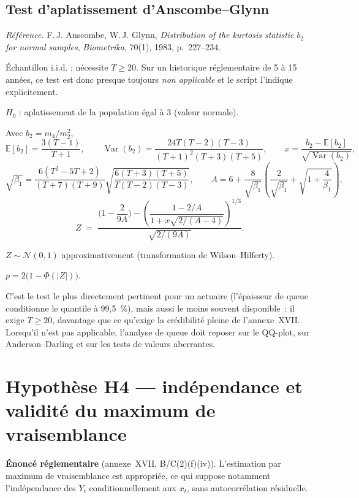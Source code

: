 \documentclass[a4paper,11pt]{article}
\newcommand{\refl}[1]{{\small\textcolor{maincolor!70!black}{\textit{Référence.} #1}}\par\smallskip}
\newcounter{ficheid}
\newenvironment{fiche}[1]{%
  \stepcounter{ficheid}%
  \phantomsection
  \subsection{#1}%
  \label{fiche:\theficheid}%
}{%
  \end{description}\vspace{0.5em}%
}
\newcommand{\Cadre}{%
  \begin{description}[leftmargin=0pt, style=unboxed, itemsep=3pt, topsep=3pt, parsep=2pt]%
  \item[\textcolor{financeblue}{\textbf{1. Cadre, notations et hypothèses de validité (non testées).}}]}
\newcommand{\Hzero}{\item[\textcolor{financeblue}{\textbf{2. Hypothèse nulle.}}]}
\newcommand{\Stat}{\item[\textcolor{financeblue}{\textbf{3. Statistique de test.}}]}
\newcommand{\Loi}{\item[\textcolor{financeblue}{\textbf{4. Loi sous $H_0$.}}]}
\newcommand{\Pval}{\item[\textcolor{financeblue}{\textbf{5. p-value.}}]}
\newcommand{\Usage}{\item[\textcolor{financeblue}{\textbf{6. Usage et limites.}}]}
\begin{document}
\begin{fiche}{Test d'aplatissement d'Anscombe--Glynn}
\refl{F.\,J. Anscombe, W.\,J. Glynn, \emph{Distribution of the kurtosis statistic $b_2$ for
normal samples}, \emph{Biometrika}, 70(1), 1983, p.~227--234.}
\Cadre
Échantillon i.i.d. ; nécessite $T \ge 20$. Sur un historique réglementaire de 5 à 15 années, ce
test est donc presque toujours \emph{non applicable} et le script l'indique explicitement.
\Hzero
$H_0$ : aplatissement de la population égal à 3 (valeur normale).
\Stat
Avec $b_2 = m_4/m_2^2$,
\[
  \mathbb{E}[b_2] = \frac{3(T-1)}{T+1},
  \qquad
  \operatorname{Var}(b_2) = \frac{24T(T-2)(T-3)}{(T+1)^2(T+3)(T+5)},
  \qquad
  x = \frac{b_2 - \mathbb{E}[b_2]}{\sqrt{\operatorname{Var}(b_2)}},
\]
\[
  \sqrt{\beta_1} = \frac{6(T^2-5T+2)}{(T+7)(T+9)}\sqrt{\frac{6(T+3)(T+5)}{T(T-2)(T-3)}},
  \qquad
  A = 6 + \frac{8}{\sqrt{\beta_1}}\left(\frac{2}{\sqrt{\beta_1}} + \sqrt{1 + \frac{4}{\beta_1}}\right),
\]
\[
  Z \;=\; \frac{\Big(1 - \dfrac{2}{9A}\Big) - \left(\dfrac{1 - 2/A}{1 + x\sqrt{2/(A-4)}}\right)^{1/3}}
                {\sqrt{2/(9A)}} .
\]
\Loi
$Z \sim \mathcal{N}(0,1)$ approximativement (transformation de Wilson--Hilferty).
\Pval
$p = 2\big(1 - \Phi(|Z|)\big)$.
\Usage
C'est le test le plus directement pertinent pour un actuaire (l'épaisseur de queue conditionne le
quantile à 99,5~\%), mais aussi le moins souvent disponible~: il exige $T \ge 20$, davantage que
ce qu'exige la crédibilité pleine de l'annexe~XVII. Lorsqu'il n'est pas applicable, l'analyse de
queue doit reposer sur le QQ-plot, sur Anderson--Darling et sur les tests de valeurs aberrantes.
\end{fiche}

\newpage
\clearpage
\section{Hypothèse H4 --- indépendance et validité du maximum de vraisemblance}

\begin{encadre}
\textbf{Énoncé réglementaire} (annexe~XVII, B/C(2)(f)(iv)). L'estimation par maximum de
vraisemblance est appropriée, ce qui suppose notamment l'indépendance des $Y_t$ conditionnellement
aux $x_t$, sans autocorrélation résiduelle.
\end{encadre}
\end{document}
